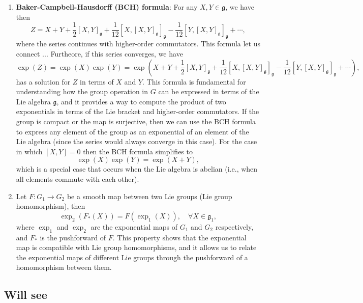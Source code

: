 \begin{proposition}
\begin{enumerate}
        \item \textbf{Baker-Campbell-Hausdorff (BCH) formula}: For any \(X,Y \in \mathfrak{g}\), we have then
              \[
                  Z = X + Y + \frac{1}{2} [X,Y]_\mathfrak{g} + \frac{1}{12} [X,[X,Y]_\mathfrak{g}]_\mathfrak{g} - \frac{1}{12} [Y,[X,Y]_\mathfrak{g}]_\mathfrak{g} + \cdots,
              \]
              where the series continues with higher-order commutators. This formula let us connect ...
              Furtheore, if this series converges, we have
              \[
                  \exp(Z) = \exp(X) \exp(Y) = \exp\left(X + Y + \frac{1}{2} [X,Y]_\mathfrak{g} + \frac{1}{12} [X,[X,Y]_\mathfrak{g}]_\mathfrak{g} - \frac{1}{12} [Y,[X,Y]_\mathfrak{g}]_\mathfrak{g} + \cdots\right),
              \]
              has a solution for \(Z\) in terms of \(X\) and \(Y\). This formula is fundamental for understanding how the group operation in \(G\) can be expressed in terms of the Lie algebra \(\mathfrak{g}\), and it provides a way to compute the product of two exponentials in terms of the Lie bracket and higher-order commutators. If the group is compact or the map is surjective, then we can use the BCH formula to express any element of the group as an exponential of an element of the Lie algebra (since the series would always converge in this case). For the case in which \([X,Y]=0\) then the BCH formula simplifies to
              \[
                  \exp(X) \exp(Y) = \exp(X + Y),
              \]
              which is a special case that occurs when the Lie algebra is abelian (i.e., when all elements commute with each other).
        \item Let \(F : G_1 \to G_2\) be a smooth map between two Lie groups (Lie group homomorphism), then
              \[
                  \exp_2(F_*(X)) = F(\exp_1(X)), \quad \forall X \in \mathfrak{g}_1,
              \]
              where \(\exp_1\) and \(\exp_2\) are the exponential maps of \(G_1\) and \(G_2\) respectively, and \(F_*\) is the pushforward of \(F\). This property shows that the exponential map is compatible with Lie group homomorphisms, and it allows us to relate the exponential maps of different Lie groups through the pushforward of a homomorphism between them.
    \end{enumerate}
\end{proposition}

\subsection{Will see}

